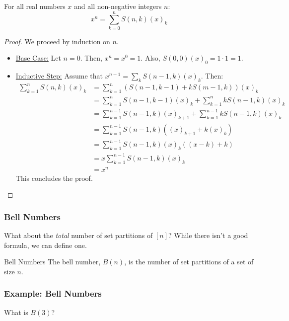 \documentclass[letterpaper]{article}
\begin{document}
\begin{corollary}{}{}
    For all real numbers $x$ and all non-negative integers $n$:
    \[x^n = \sum_{k = 0}^n S(n, k) (x)_k\]
\end{corollary}

\begin{proof}
    We proceed by induction on $n$.
    \begin{itemize}
        \item[\mdiamond] \underline{Base Case:} Let $n = 0$. Then, $x^n = x^0 = 1$. Also, $S(0, 0)(x)_0 = 1 \cdot 1 = 1$.
        \item[\mdiamond] \underline{Inductive Step:} Assume that $x^{n - 1} = \sum_{k} S(n - 1, k) (x)_k$. Then: 
        \begin{equation*}
            \begin{aligned}
                \sum_{k = 1}^n S(n, k)(x)_k &= \sum_{k = 1}^n (S(n - 1, k - 1) + kS(m - 1, k))(x)_k \\ 
                &= \sum_{k = 1}^n S(n - 1, k - 1)(x)_k + \sum_{k = 1}^n kS(n - 1, k)(x)_k \\ 
                &= \sum_{k = 1}^{n - 1} S(n - 1, k)(x)_{k + 1} + \sum_{k = 1}^{n - 1} kS(n - 1, k)(x)_k \\ 
                &= \sum_{k = 1}^{n - 1} S(n - 1, k)((x)_{k + 1} + k(x)_k) \\ 
                &= \sum_{k = 1}^{n - 1} S(n - 1, k)(x)_{k}((x - k) + k) \\ 
                &= x\sum_{k = 1}^{n - 1} S(n - 1, k)(x)_k \\ 
                &= x^n
            \end{aligned}
        \end{equation*}
        This concludes the proof. \qedhere  
    \end{itemize}
\end{proof}

\subsubsection{Bell Numbers}
What about the \emph{total} number of set partitions of $[n]$? While there isn't a good formula, we can define one.

\begin{definition}{Bell Numbers}{}
    The bell number, $B(n)$, is the number of set partitions of a set of size $n$.
\end{definition}

\subsubsection{Example: Bell Numbers}
What is $B(3)$?
\end{document}
